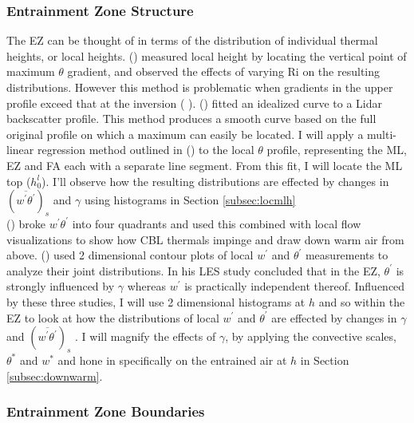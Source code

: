\subsubsection{Entrainment Zone Structure}     
The \acs{EZ} can be thought of in terms of the distribution of individual thermal heights, or local heights. \citeauthor{SullMoengStev} (\citeyear{SullMoengStev}) measured local height by locating the vertical point of maximum $\theta$ gradient, and observed the effects of varying \acs{Ri} on the resulting distributions. However this method is problematic when gradients in the upper profile exceed that at the inversion (\citeauthor{BrooksFowler2} \citeyear{BrooksFowler2}).  \citeauthor{SteynBaldHoff} (\citeyear{SteynBaldHoff}) fitted an idealized curve to a Lidar backscatter profile.  This method produces a smooth curve based on the full original profile on which a maximum can easily be located.  I will apply a multi-linear regression method outlined in \citeauthor{Vieth} (\citeyear{Vieth}) to the local $\theta$ profile, representing the \acs{ML}, \acs{EZ} and \acs{FA} each with a separate line segment. From this fit, I will locate the \acs{ML} top ($h^{l}_{0}$).  I'll observe how the resulting distributions are effected by changes in $(\overline{w^{'}\theta^{'}})_{s}$ and $\gamma$ using histograms in Section \ref{subsec:locmlh}\\

\citeauthor{SullMoengStev} (\citeyear{SullMoengStev}) broke $w^{'}\theta^{'}$ into four quadrants and used this combined with local flow visualizations to show how \acs{CBL} thermals impinge and draw down warm air from above. \citeauthor{MahrtPaum} (\citeyear{MahrtPaum}) used 2 dimensional contour plots of local $w^{'}$ and $\theta^{'}$ measurements to analyze their joint distributions.  In his \citeyear{Sorbjan1} \acs{LES} study \citeauthor{Sorbjan1} concluded that in the \acs{EZ}, $\theta^{'}$ is strongly influenced by $\gamma$  whereas $w^{'}$ is practically independent thereof.  Influenced by these three studies, I will use 2 dimensional histograms at $h$ and so within the \acs{EZ} to look at how the distributions of local $w^{'}$ and $\theta^{'}$ are effected by changes in $\gamma$ and $(\overline{w^{'}\theta^{'}})_{s}$ .  I will magnify the effects of $\gamma$, by applying the convective scales, $\theta^{*}$ and $w^{*}$ and hone in specifically on the entrained air at $h$ in Section \ref{subsec:downwarm}.\\    

\subsubsection{Entrainment Zone Boundaries}
       

